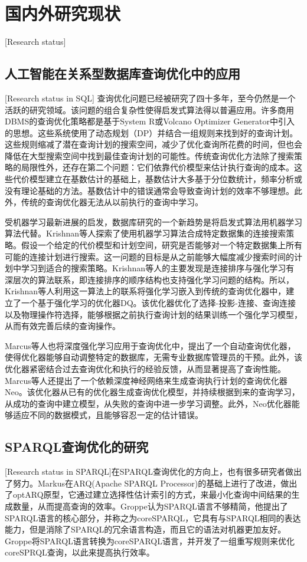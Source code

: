\section{国内外研究现状}[Research status]

\subsection{人工智能在关系型数据库查询优化中的应用}[Research status in SQL]
查询优化问题已经被研究了四十多年，至今仍然是一个活跃的研究领域。该问题的组合复杂性使得启发式算法得以普遍应用\cite{DRL}。许多商用DBMS的查询优化策略都是基于System R\cite{SystemR}或Volcano Optimizer Generator\cite{Volcano}中引入的思想。这些系统使用了动态规划（DP）并结合一组规则来找到好的查询计划。这些规则缩减了潜在查询计划的搜索空间，减少了优化查询所花费的时间，但也会降低在大型搜索空间中找到最佳查询计划的可能性。传统查询优化方法除了搜索策略的局限性外，还存在第二个问题：它们依靠代价模型来估计执行查询的成本。这些代价模型建立在基数估计的基础上，基数估计大多基于分位数统计，频率分析或没有理论基础的方法。基数估计中的错误通常会导致查询计划的效率不够理想。此外，传统的查询优化器无法从以前执行的查询中学习。

受机器学习最新进展的启发，数据库研究的一个新趋势是将启发式算法用机器学习算法代替。Krishnan等人探索了使用机器学习算法合成特定数据集的连接搜索策略\cite{DRLJoin}。假设一个给定的代价模型和计划空间，研究是否能够对一个特定数据集上所有可能的连接计划进行搜索。这一问题的目标是从之前能够大幅度减少搜索时间的计划中学习到适合的搜索策略。Krishnan等人的主要发现是连接排序与强化学习有深层次的算法联系，即连接排序的顺序结构也支持强化学习问题的结构。所以，Krishnan等人利用这一算法上的联系将强化学习嵌入到传统的查询优化器中，建立了一个基于强化学习的优化器DQ。该优化器优化了选择-投影-连接、查询连接以及物理操作符选择，能够根据之前执行查询计划的结果训练一个强化学习模型，从而有效完善后续的查询操作。

Marcus等人也将深度强化学习应用于查询优化中，提出了一个自动查询优化器，使得优化器能够自动调整特定的数据库，无需专业数据库管理员的干预\cite{Hands-Free}。此外，该优化器紧密结合过去查询优化和执行的经验反馈，从而显著提高了查询性能。Marcus等人还提出了一个依赖深度神经网络来生成查询执行计划的查询优化器Neo\cite{Neo}。该优化器从已有的优化器生成查询优化模型，并持续根据到来的查询学习，从成功的查询中建立模型，从失败的查询中进一步学习调整。此外，Neo优化器能够适应不同的数据模式，且能够容忍一定的估计错误。

\subsection{SPARQL查询优化的研究}[Research status in SPARQL]在SPARQL查询优化的方向上，也有很多研究者做出了努力。Markus在ARQ(Apache SPARQL Processor)的基础上进行了改进\cite{OptARQ}，做出了optARQ原型，它通过建立选择性估计索引的方式，来最小化查询中间结果的生成数量，从而提高查询的效率。Groppe认为SPARQL语言不够精简\cite{coreSPARQL}，他提出了SPARQL语言的核心部分，并称之为coreSPARQL，它具有与SPARQL相同的表达能力，但是消除了SPARQL的冗余语言构造，而且它的语法对机器更加友好。Groppe将SPARQL语言转换为coreSPARQL语言，并开发了一组重写规则来优化coreSPRQL查询，以此来提高执行效率。

